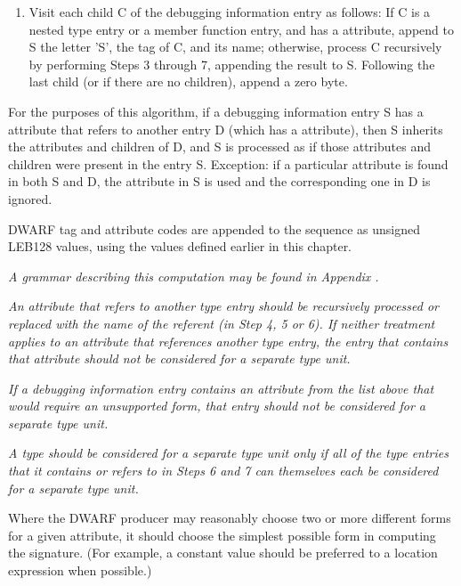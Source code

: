 \begin{enumerate}[1.]
\item Visit each child C of the debugging information
entry as follows: If C is a nested type entry or a member
function entry, and has a  attribute, append to
S the letter 'S', the tag of C, and its name; otherwise,
process C recursively by performing Steps 3 through 7,
appending the result to S. Following the last child (or if
there are no children), append a zero byte.
\end{enumerate}



For the purposes of this algorithm, if a debugging information
entry S has a 
attribute that refers to
another entry D (which has a 
attribute),
then S inherits the attributes and children of D, and S is
processed as if those attributes and children were present in
the entry S. Exception: if a particular attribute is found in
both S and D, the attribute in S is used and the corresponding
one in D is ignored.

DWARF tag and attribute codes are appended to the sequence
as unsigned LEB128 values, using the values defined earlier
in this chapter.

\textit{A grammar describing this computation may be found in
Appendix .
}

\textit{An attribute that refers to another type entry should
be recursively processed or replaced with the name of the
referent (in Step 4, 5 or 6). If neither treatment applies to
an attribute that references another type entry, the entry
that contains that attribute should not be considered for a
separate type unit.}

\textit{If a debugging information entry contains an attribute from
the list above that would require an unsupported form, that
entry should not be considered for a separate type unit.}

\textit{A type should be considered for a separate type unit only
if all of the type entries that it contains or refers to in
Steps 6 and 7 can themselves each be considered for a separate
type unit.}

Where the DWARF producer may reasonably choose two or more
different forms for a given attribute, it should choose
the simplest possible form in computing the signature. (For
example, a constant value should be preferred to a location
expression when possible.)


